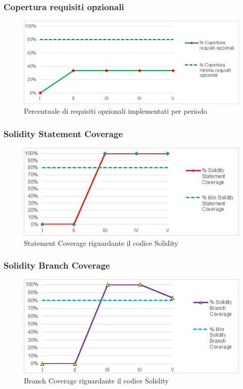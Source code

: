\subsubsection{Copertura requisiti opzionali}
\begin{figure}[H]
  \centering
  \includegraphics[scale=0.8]{immagini/cop_opzionali.jpg}
  \caption{Percentuale di requisiti opzionali implementati per periodo}
\end{figure}

\subsubsection{Solidity Statement Coverage}
\begin{figure}[H]
  \centering
  \includegraphics[scale=0.8]{immagini/solidity_statement.jpg}
  \caption{Statement Coverage riguardante il codice Solidity}
\end{figure}

\subsubsection{Solidity Branch Coverage}
\begin{figure}[H]
  \centering
  \includegraphics[scale=0.8]{immagini/solidity_branch.jpg}
  \caption{Branch Coverage riguardante il codice Solidity}
\end{figure}


